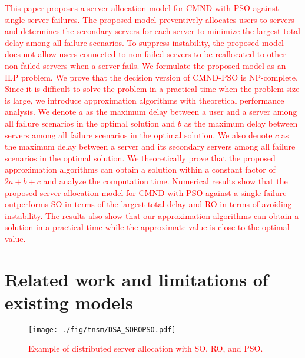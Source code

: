 \documentclass[10pt, letterpaper]{IEEEtran}
\newcommand\red[1]{\textcolor{red}{#1}}
\begin{document}
\begin{CJK}{UTF8}{ipxm}
\red{
This paper proposes a server allocation model for CMND with PSO against single-server failures.
The proposed model preventively allocates users to servers and determines the secondary servers for each server to minimize the largest total delay among all failure scenarios.
To suppress instability, the proposed model does not allow users connected to non-failed servers to be reallocated to other non-failed servers when a server fails.
We formulate the proposed model as an ILP problem.
We prove that the decision version of CMND-PSO is NP-complete.
Since it is difficult to solve the problem in a practical time when the problem size is large, we introduce approximation algorithms with theoretical performance analysis.
We denote $a$ as the maximum delay between a user and a server among all failure scenarios in the optimal solution and $b$ as the maximum delay between servers among all failure scenarios in the optimal solution.
We also denote $c$ as the maximum delay between a server and its secondary servers among all failure scenarios in the optimal solution.
We theoretically prove that the proposed approximation algorithms can obtain a solution within a constant factor of $2a+b+c$ and analyze the computation time.
Numerical results show that the proposed server allocation model for CMND with PSO against a single failure outperforms SO in terms of the largest total delay and RO in terms of avoiding instability.
The results also show that our approximation algorithms can obtain a solution in a practical time while the approximate value is close to the optimal value.
}

\section{Related work and limitations of existing models}
\label{sec:related_work}

\begin{figure}[tb]
  \begin{center}
      \texttt{[image: ./fig/tnsm/DSA\_SOROPSO.pdf]}
  \end{center}
  \caption{\red{Example of distributed server allocation with SO, RO, and PSO.}}
  \label{fig:DSA_SOROPSO}
\end{figure}


\end{CJK}
\end{document}
